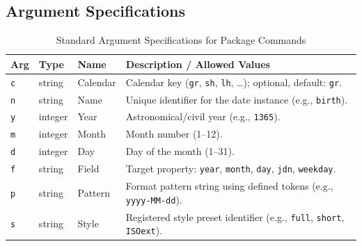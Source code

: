 \documentclass[10pt]{article}
\begin{document}
\subsection{Argument Specifications}
\begin{table}[h!]
    \caption{Standard Argument Specifications for Package Commands}
    \label{tab:api-args}
    \vspace{2pt}
    \centering\small
    \begin{tabular}{llll}
        \toprule
        \textbf{Arg} & \textbf{Type} & \textbf{Name} & \textbf{Description / Allowed Values}                                                         \\
        \midrule
        \texttt{c}   & string        & Calendar      & Calendar key (\texttt{gr}, \texttt{sh}, \texttt{lh}, \dots); optional, default: \texttt{gr}.  \\
        \texttt{n}   & string        & Name          & Unique identifier for the date instance (e.g., \texttt{birth}).                               \\
        \texttt{y}   & integer       & Year          & Astronomical/civil year (e.g., \texttt{1365}).                                                \\
        \texttt{m}   & integer       & Month         & Month number (1--12).                                                                         \\
        \texttt{d}   & integer       & Day           & Day of the month (1--31).                                                                     \\
        \texttt{f}   & string        & Field         & Target property: \texttt{year}, \texttt{month}, \texttt{day}, \texttt{jdn}, \texttt{weekday}. \\
        \texttt{p}   & string        & Pattern       & Format pattern string using defined tokens (e.g., \verb|yyyy-MM-dd|).                         \\
        \texttt{s}   & string        & Style         & Registered style preset identifier (e.g., \texttt{full}, \texttt{short}, \texttt{ISOext}).    \\
        \bottomrule
    \end{tabular}
\end{table}
\end{document}
